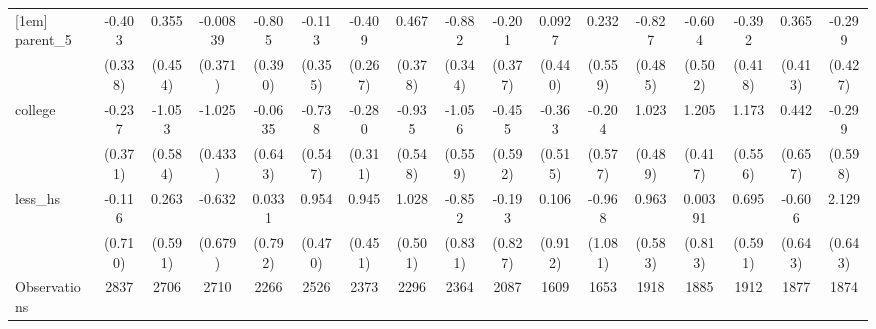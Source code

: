 {\begin{tabular}{l*{16}{c}}
[1em]
parent\_5            &      -0.403         &       0.355         &    -0.00839         &      -0.805\sym{*}  &      -0.113         &      -0.409         &       0.467         &      -0.882\sym{*}  &      -0.201         &      0.0927         &       0.232         &      -0.827         &      -0.604         &      -0.392         &       0.365         &      -0.299         \\
                    &     (0.338)         &     (0.454)         &     (0.371)         &     (0.390)         &     (0.355)         &     (0.267)         &     (0.378)         &     (0.344)         &     (0.377)         &     (0.440)         &     (0.559)         &     (0.485)         &     (0.502)         &     (0.418)         &     (0.413)         &     (0.427)         \\
[1em]
college             &      -0.237         &      -1.053         &      -1.025\sym{*}  &     -0.0635         &      -0.738         &      -0.280         &      -0.935         &      -1.056         &      -0.455         &      -0.363         &      -0.204         &       1.023\sym{*}  &       1.205\sym{**} &       1.173\sym{*}  &       0.442         &      -0.299         \\
                    &     (0.371)         &     (0.584)         &     (0.433)         &     (0.643)         &     (0.547)         &     (0.311)         &     (0.548)         &     (0.559)         &     (0.592)         &     (0.515)         &     (0.577)         &     (0.489)         &     (0.417)         &     (0.556)         &     (0.657)         &     (0.598)         \\
[1em]
less\_hs             &      -0.116         &       0.263         &      -0.632         &      0.0331         &       0.954\sym{*}  &       0.945\sym{*}  &       1.028\sym{*}  &      -0.852         &      -0.193         &       0.106         &      -0.968         &       0.963         &     0.00391         &       0.695         &      -0.606         &       2.129\sym{***}\\
                    &     (0.710)         &     (0.591)         &     (0.679)         &     (0.792)         &     (0.470)         &     (0.451)         &     (0.501)         &     (0.831)         &     (0.827)         &     (0.912)         &     (1.081)         &     (0.583)         &     (0.813)         &     (0.591)         &     (0.643)         &     (0.643)         \\
\hline
Observations        &        2837         &        2706         &        2710         &        2266         &        2526         &        2373         &        2296         &        2364         &        2087         &        1609         &        1653         &        1918         &        1885         &        1912         &        1877         &        1874         \\

\end{tabular}}
